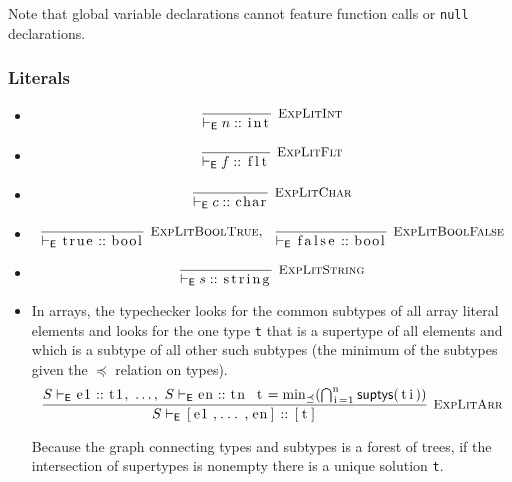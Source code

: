 \documentclass{article}
\newcommand{\code}[1]{\lstinline[columns=fixed]{#1}}
\newcommand{\drmrule}[5]{\frac{#1}{#2\vdash_{\mathsf{#3}}#4}\textsc{\ \small{#5}}}
\newcommand{\ruleapp}[1]{\vdash_{\mathsf{#1}}}
\newcommand{\mc}[1]{\textnormal{\code{#1}}}
\begin{document}
					Note that global variable declarations cannot feature function calls or \code{null} declarations.
		
			\subsubsection{Literals}
			
				\begin{itemize}
					\item
						\begin{align*}
							\drmrule{}{}{E}{n :: \mc{int}}{ExpLitInt}
						\end{align*}
					\item
						\begin{align*}
							\drmrule{}{}{E}{f :: \mc{flt}}{ExpLitFlt}
						\end{align*}
					\item
						\begin{align*}
							\drmrule{}{}{E}{c :: \mc{char}}{ExpLitChar}
						\end{align*}
					\item
						\begin{align*}
							\drmrule{}{}{E}{\mc{true} :: \mc{bool}}{ExpLitBoolTrue},\ \ 
							\drmrule{}{}{E}{\mc{false} :: \mc{bool}}{ExpLitBoolFalse}
						\end{align*}
					\item
						\begin{align*}
							\drmrule{}{}{E}{s :: \mc{string}}{ExpLitString}
						\end{align*}
					\item
						In arrays, the typechecker looks for the common subtypes of all array literal elements and looks for the one type \code{t} that is a supertype of all elements and which is a subtype of all other such subtypes (the minimum of the subtypes given the $\preceq$ relation on types).
						\begin{align*}
							\drmrule{S\ruleapp{E}\mc{e1}::\mc{t1},\ \dots,\ S\ruleapp{E}\mc{en}::\mc{tn}\ \ \mc{t} = \min_\preceq (\bigcap_{\mc{i}=\mc{1}}^{\mc{n}}\mathsf{suptys}(\mc{ti}))}{S}{E}{\mc{[e1,...,en]} :: \mc{[t]}}{ExpLitArr}
						\end{align*}
						
						Because the graph connecting types and subtypes is a forest of trees, if the intersection of supertypes is nonempty there is a unique solution \code{t}.
				\end{itemize}
			
\end{document}
